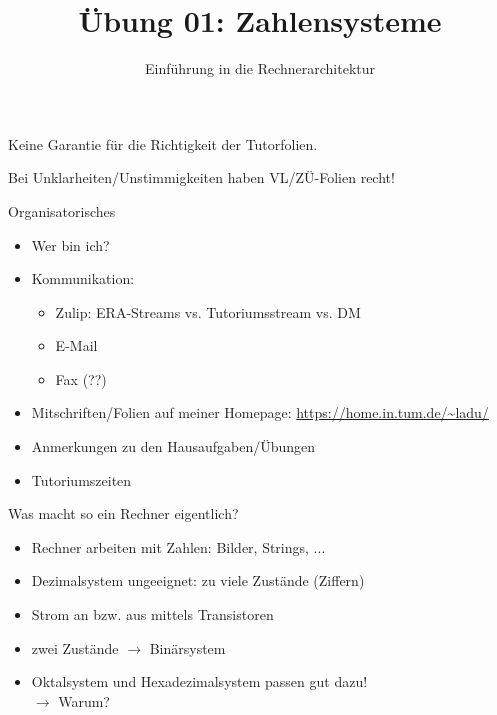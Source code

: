 

\title{Übung 01: Zahlensysteme}
\subtitle{Einführung in die Rechnerarchitektur}
\date{}



\maketitle

\begin{frame}[c]{}{}
	\begin{center}
		\LARGE  Keine Garantie für die Richtigkeit der Tutorfolien.

		\Large Bei Unklarheiten/Unstimmigkeiten haben VL/ZÜ-Folien recht!
	\end{center}
\end{frame}

\begin{frame}[c]{Organisatorisches}{}
	\begin{itemize}
		\item Wer bin ich?
		\item Kommunikation:
		      \begin{itemize}
			      \item Zulip: ERA-Streams vs. Tutoriumsstream vs. DM
			      \item E-Mail
			      \item Fax (??)
		      \end{itemize}
		\item Mitschriften/Folien auf meiner Homepage: \url{https://home.in.tum.de/~ladu/}
		\item Anmerkungen zu den Hausaufgaben/Übungen
		\item Tutoriumszeiten
	\end{itemize}
\end{frame}

\begin{frame}[c]{Was macht so ein Rechner eigentlich?}{}
	\begin{itemize}
		\item Rechner arbeiten mit Zahlen: Bilder, Strings, ...
		\item Dezimalsystem ungeeignet: zu viele Zustände (Ziffern)
		\item Strom an bzw. aus mittels Transistoren
		\item zwei Zustände $\rightarrow$ Binärsystem
		\item Oktalsystem und Hexadezimalsystem passen gut dazu! \\ $\rightarrow$ Warum?
	\end{itemize}
\end{frame}


